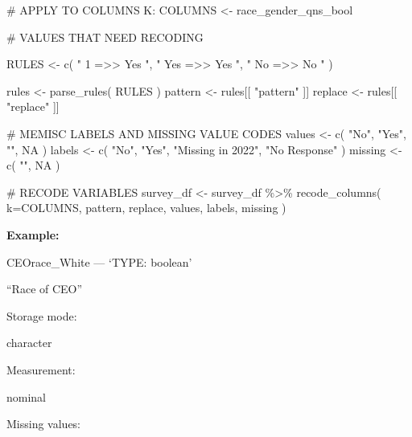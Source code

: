 \documentclass[
  letterpaper,
]{scrbook}
\newenvironment{Shaded}{\begin{snugshade}}{\end{snugshade}}
\newcommand{\AttributeTok}[1]{\textcolor[rgb]{0.40,0.45,0.13}{#1}}
\newcommand{\CommentTok}[1]{\textcolor[rgb]{0.37,0.37,0.37}{#1}}
\newcommand{\ConstantTok}[1]{\textcolor[rgb]{0.56,0.35,0.01}{#1}}
\newcommand{\FunctionTok}[1]{\textcolor[rgb]{0.28,0.35,0.67}{#1}}
\newcommand{\NormalTok}[1]{\textcolor[rgb]{0.00,0.23,0.31}{#1}}
\newcommand{\OtherTok}[1]{\textcolor[rgb]{0.00,0.23,0.31}{#1}}
\newcommand{\SpecialCharTok}[1]{\textcolor[rgb]{0.37,0.37,0.37}{#1}}
\newcommand{\StringTok}[1]{\textcolor[rgb]{0.13,0.47,0.30}{#1}}
\begin{document}
\begin{Shaded}
\begin{Highlighting}[]
\CommentTok{\# APPLY TO COLUMNS K:}
\NormalTok{COLUMNS }\OtherTok{\textless{}{-}}\NormalTok{  race\_gender\_qns\_bool}


\CommentTok{\# VALUES THAT NEED RECODING}

\NormalTok{RULES }\OtherTok{\textless{}{-}} \FunctionTok{c}\NormalTok{(     }\StringTok{"    1    =\textgreater{}\textgreater{}    Yes    "}\NormalTok{, }
                \StringTok{"  Yes    =\textgreater{}\textgreater{}    Yes    "}\NormalTok{, }
                \StringTok{"   No    =\textgreater{}\textgreater{}     No    "}\NormalTok{     )}


\NormalTok{rules }\OtherTok{\textless{}{-}} \FunctionTok{parse\_rules}\NormalTok{( RULES )}
\NormalTok{pattern }\OtherTok{\textless{}{-}}\NormalTok{ rules[[ }\StringTok{"pattern"}\NormalTok{ ]]}
\NormalTok{replace }\OtherTok{\textless{}{-}}\NormalTok{ rules[[ }\StringTok{"replace"}\NormalTok{ ]]}

\CommentTok{\# MEMISC LABELS AND MISSING VALUE CODES}
\NormalTok{values  }\OtherTok{\textless{}{-}} \FunctionTok{c}\NormalTok{( }\StringTok{"No"}\NormalTok{, }\StringTok{"Yes"}\NormalTok{, }\StringTok{""}\NormalTok{, }\ConstantTok{NA}\NormalTok{ )}
\NormalTok{labels  }\OtherTok{\textless{}{-}} \FunctionTok{c}\NormalTok{( }\StringTok{"No"}\NormalTok{, }\StringTok{"Yes"}\NormalTok{, }\StringTok{"Missing in 2022"}\NormalTok{, }\StringTok{"No Response"}\NormalTok{ )}
\NormalTok{missing }\OtherTok{\textless{}{-}} \FunctionTok{c}\NormalTok{( }\StringTok{""}\NormalTok{, }\ConstantTok{NA}\NormalTok{ )}

\CommentTok{\# RECODE VARIABLES}
\NormalTok{survey\_df }\OtherTok{\textless{}{-}}
\NormalTok{  survey\_df }\SpecialCharTok{\%\textgreater{}\%}
  \FunctionTok{recode\_columns}\NormalTok{( }\AttributeTok{k=}\NormalTok{COLUMNS, pattern, replace, values, labels, missing )}
\end{Highlighting}
\end{Shaded}

\textbf{Example:}

CEOrace\_White --- {`TYPE: boolean'}

``Race of CEO''

Storage mode:

character

Measurement:

nominal

Missing values:
\end{document}

